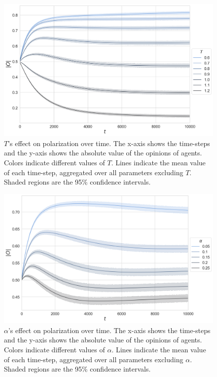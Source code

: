 \documentclass{article}
\begin{document}
\begin{figure}[H]
    \centering
    \includegraphics[width=.7\linewidth]{../plots/overall/Absolute_Opinion_Threshold.png}
  \caption{$T$'s effect on polarization over time. The x-axis shows the time-steps and the y-axis shows the absolute value of the opinions of agents. Colors indicate different values of $T$. Lines indicate the mean value of each time-step, aggregated over all parameters excluding $T$. Shaded regions are the 95\% confidence intervals.}
  \label{fig:threshold}
\end{figure}

\begin{figure}[H]
    \centering
    \includegraphics[width=.7\linewidth]{../plots/overall/Absolute_Opinion_Positive_Learning_Rate.png}
  \caption{$\alpha$'s effect on polarization over time. The x-axis shows the time-steps and the y-axis shows the absolute value of the opinions of agents. Colors indicate different values of $\alpha$. Lines indicate the mean value of each time-step, aggregated over all parameters excluding $\alpha$. Shaded regions are the 95\% confidence intervals.}
  \label{fig:alpha}
\end{figure}
\end{document}
